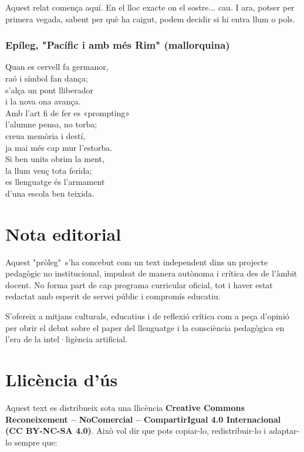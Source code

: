 \documentclass[12pt,a4paper]{article}
\begin{document}
	Aquest relat comença aquí. En el lloc exacte on el sostre... cau.  
	I ara, potser per primera vegada, sabent per què ha caigut, podem decidir si hi entra llum o pols.\\
	
	\subsubsection*{Epíleg, "Pacífic i amb més Rim" (mallorquina)}
	\noindent Quan es cervell fa germanor, \\
	raó i símbol fan dança;  \\
	s’alça un pont lliberador  \\
	i la nova ona avança.  \\
	
	\noindent Amb l’art fi de fer es «prompting»\\  
	l’alumne pensa, no torba;  \\
	creua memòria i destí,  \\
	ja mai més cap mur l’estorba.\\  
	
	\noindent Si ben units obrim la ment,  \\
	la llum venç tota ferida;  \\
	es llenguatge és l’armament  \\
	d’una escola ben teixida. \\

\section*{Nota editorial}

Aquest "pròleg"~s’ha concebut com un text independent dins un projecte pedagògic no institucional, impulsat de manera autònoma i crítica des de l’àmbit docent. No forma part de cap programa curricular oficial, tot i haver estat redactat amb esperit de servei públic i compromís educatiu.

S’ofereix a mitjans culturals, educatius i de reflexió crítica com a peça d’opinió per obrir el debat sobre el paper del llenguatge i la consciència pedagògica en l’era de la intel·ligència artificial.

\section*{Llicència d’ús}

Aquest text es distribueix sota una llicència \textbf{Creative Commons Reconeixement – NoComercial – CompartirIgual 4.0 Internacional (CC BY-NC-SA 4.0)}. Això vol dir que pots copiar-lo, redistribuir-lo i adaptar-lo sempre que:
\end{document}
